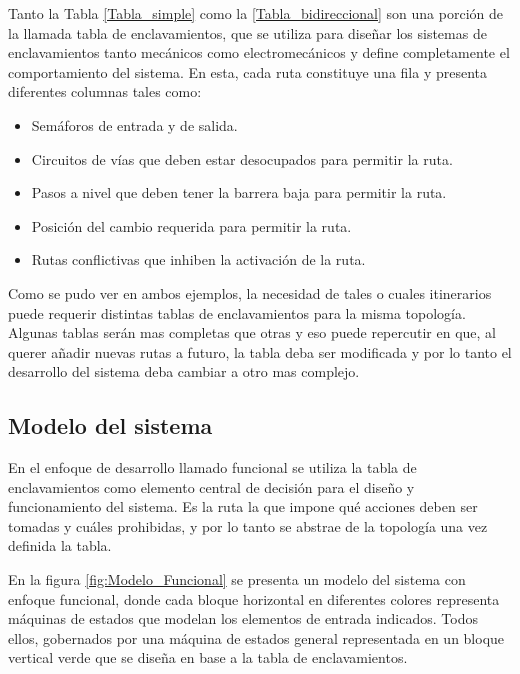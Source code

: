 	\vspace{5cm}
	
	Tanto la Tabla \ref{Tabla_simple} como la \ref{Tabla_bidireccional} son una porción de la llamada tabla de enclavamientos, que se utiliza para diseñar los sistemas de enclavamientos tanto mecánicos como electromecánicos y define completamente el comportamiento del sistema. En esta, cada ruta constituye una fila y presenta diferentes columnas tales como:
	
	\begin{itemize}
		\item Semáforos de entrada y de salida.
		\item Circuitos de vías que deben estar desocupados para permitir la ruta.
		\item Pasos a nivel que deben tener la barrera baja para permitir la ruta.
		\item Posición del cambio requerida para permitir la ruta.
		\item Rutas conflictivas que inhiben la activación de la ruta.
	\end{itemize}
	
	Como se pudo ver en ambos ejemplos, la necesidad de tales o cuales itinerarios puede requerir distintas tablas de enclavamientos para la misma topología. Algunas tablas serán mas completas que otras y eso puede repercutir en que, al querer añadir nuevas rutas a futuro, la tabla deba ser modificada y por lo tanto el desarrollo del sistema deba cambiar a otro mas complejo.
	
	\subsection{Modelo del sistema}
		
		En el enfoque de desarrollo llamado funcional se utiliza la tabla de enclavamientos como elemento central de decisión para el diseño y funcionamiento del sistema. Es la ruta la que impone qué acciones deben ser tomadas y cuáles prohibidas, y por lo tanto se abstrae de la topología una vez definida la tabla.
			
		En la figura \ref{fig:Modelo_Funcional} se presenta un modelo del sistema con enfoque funcional, donde cada bloque horizontal en diferentes colores representa máquinas de estados que modelan los elementos de entrada indicados. Todos ellos, gobernados por una máquina de estados general representada en un bloque vertical verde que se diseña en base a la tabla de enclavamientos. 	
		

